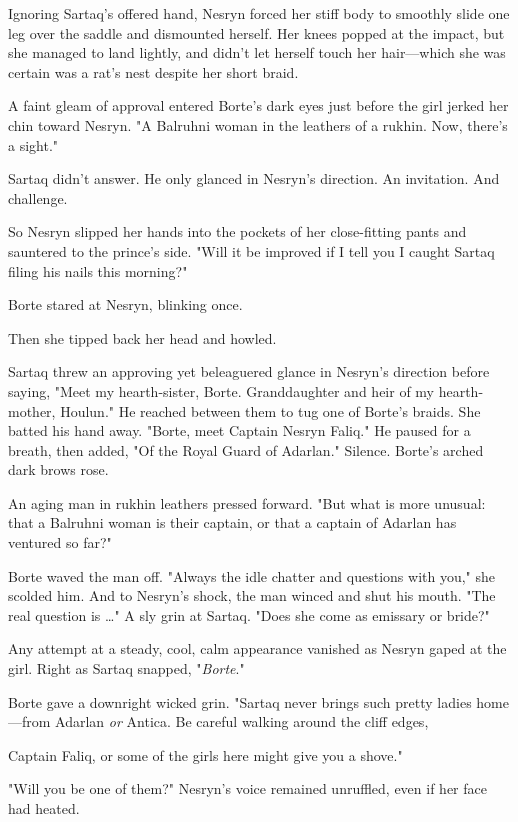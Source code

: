 Ignoring Sartaq's offered hand, Nesryn forced her stiff body to smoothly slide one leg over the saddle and dismounted herself. Her knees popped at the impact, but she managed to land lightly, and didn't let herself touch her hair---which she was certain was a rat's nest despite her short braid.

A faint gleam of approval entered Borte's dark eyes just before the girl jerked her chin toward Nesryn. "A Balruhni woman in the leathers of a rukhin. Now, there's a sight."

Sartaq didn't answer. He only glanced in Nesryn's direction. An invitation. And challenge.

So Nesryn slipped her hands into the pockets of her close-fitting pants and sauntered to the prince's side. "Will it be improved if I tell you I caught Sartaq filing his nails this morning?"

Borte stared at Nesryn, blinking once.

Then she tipped back her head and howled.

Sartaq threw an approving yet beleaguered glance in Nesryn's direction before saying, "Meet my hearth-sister, Borte. Granddaughter and heir of my hearth-mother, Houlun." He reached between them to tug one of Borte's braids. She batted his hand away. "Borte, meet Captain Nesryn Faliq." He paused for a breath, then added, "Of the Royal Guard of Adarlan." Silence. Borte's arched dark brows rose.

An aging man in rukhin leathers pressed forward. "But what is more unusual: that a Balruhni woman is their captain, or that a captain of Adarlan has ventured so far?"

Borte waved the man off. "Always the idle chatter and questions with you," she scolded him. And to Nesryn's shock, the man winced and shut his mouth. "The real question is \ldots" A sly grin at Sartaq. "Does she come as emissary or bride?"

Any attempt at a steady, cool, calm appearance vanished as Nesryn gaped at the girl. Right as Sartaq snapped, "\emph{Borte}."

Borte gave a downright wicked grin. "Sartaq never brings such pretty ladies home---from Adarlan \emph{or} Antica. Be careful walking around the cliff edges,

Captain Faliq, or some of the girls here might give you a shove."

"Will you be one of them?" Nesryn's voice remained unruffled, even if her face had heated.

